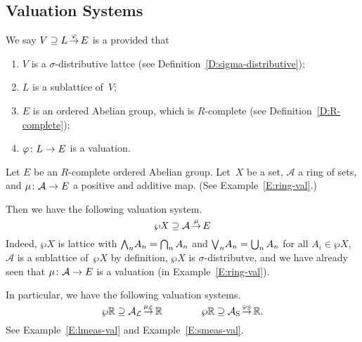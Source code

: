 \documentclass[main.tex]{subfiles}
\begin{document}
\subsection{Valuation Systems}
\label{SS:valuation-systems}
%
%

\begin{dfn}
\label{D:system}
We say $V \supseteq L\,\smash{\stackrel{\varphi}{\rightarrow}}\,E$
 is a 
provided that
\begin{enumerate}
\item \label{D:simple-system-1}
$V$ is a $\sigma$-distributive lattce 
(see Definition~\ref{D:sigma-distributive});
\item \label{D:simple-system-2}
$L$ is a sublattice of~$V$;
\item \label{D:simple-system-3}
$E$ is an ordered Abelian group,
which is $R$-complete (see Definition~\ref{D:R-complete});
\item \label{D:simple-system-4}
$\varphi\colon L\rightarrow E$ is a valuation.
\end{enumerate}
\end{dfn}
%
%
\begin{ex}
\label{E:ring-system}
Let $E$ be an $R$-complete ordered Abelian group.
Let~$X$ be a set, 
$\mathcal{A}$ a ring of sets,
and $\mu\colon \mathcal{A}\rightarrow E$
a positive and additive map.
(See Example~\ref{E:ring-val}.)

Then we have the following  valuation system.
\begin{equation*}
\wp X \supseteq \mathcal{A}\,\smash{\stackrel{\mu}{\rightarrow}}\,E
\end{equation*}
Indeed, $\wp X$ is lattice with 
$\textstyle{\bigwedge}_n A_n = \bigcap_n A_n$
and $\textstyle{\bigvee}_n A_n = \bigcup_n A_n$ for all $A_i \in \wp X$,
$\mathcal{A}$ is a sublattice of~$\wp X$
by definition,
$\wp X$ is $\sigma$-distributve,
and we have already seen 
that $\mu\colon \mathcal{A}\rightarrow E$ is a valuation
(in Example~\ref{E:ring-val}).

In particular,
we have the following valuation systems.
\begin{equation*}
\wp{\mathbb{R}} \supseteq \mathcal{A}_{\mathcal{L}}\,\smash{\stackrel{\mu_{\mathcal{L}}}{\rightarrow}}\,\mathbb{R} \qquad\qquad \wp{\mathbb{R}} \supseteq \mathcal{A}_{\mathrm{S}}\,\smash{\stackrel{\varphi_{\mathrm{S}}}{\rightarrow}}\,\mathbb{R}.
\end{equation*}
See Example~\ref{E:lmeas-val} and  Example~\ref{E:smeas-val}.
\end{ex}
\end{document}
